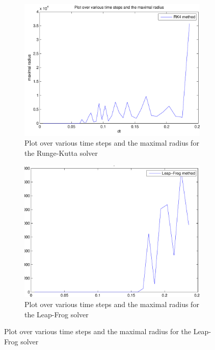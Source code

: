 \documentclass[a4paper,12pt, english]{article}
\begin{document}
        
\begin{figure}[H]
        \centering
        \begin{subfigure}[b]{0.6\textwidth}
                \includegraphics[width=\textwidth]{timestep_rk4.pdf}
                \caption{Plot over various time steps and the maximal radius for the Runge-Kutta solver}
                \label{fig:RK4_timestep}
        \end{subfigure}
        
        \begin{subfigure}[b]{0.8\textwidth}
                \includegraphics[scale=0.5]{timestep_LeapFrog.pdf}
                \caption{Plot over various time steps and the maximal radius for the Leap-Frog solver}
                \label{fig:LF_timestep}
        \end{subfigure}
        \label{timestep}
\end{figure}
\end{document}

